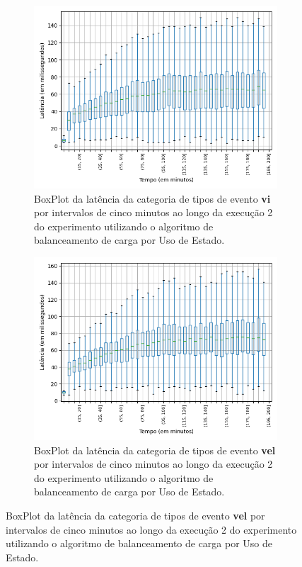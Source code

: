 \begin{figure}
\begin{subfigure}{.5\textwidth}
\centering
\includegraphics[width=\textwidth]{figuras/graphics/boxplot_7-dez-su_vi.png}
\caption{BoxPlot da latência da categoria de tipos de evento \textbf{vi} por intervalos de cinco minutos ao longo da execução 2 do experimento utilizando o algoritmo de balanceamento de carga por Uso de Estado.}
\label{fig:BoxPlot_vi_SU_7-dez-su}
\end{subfigure}%
\centering
\begin{subfigure}{.5\textwidth}
\centering
\includegraphics[width=\textwidth]{figuras/graphics/boxplot_7-dez-su_vel.png}
\caption{BoxPlot da latência da categoria de tipos de evento \textbf{vel} por intervalos de cinco minutos ao longo da execução 2 do experimento utilizando o algoritmo de balanceamento de carga por Uso de Estado.}
\label{fig:BoxPlot_vel_SU_7-dez-su}
\end{subfigure}%


\end{figure}

